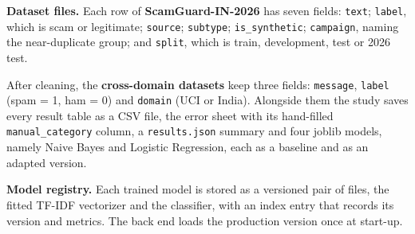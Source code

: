 \textbf{Dataset files.} Each row of \textbf{ScamGuard-IN-2026} has seven fields: \texttt{text}; \texttt{label}, which is scam or legitimate; \texttt{source}; \texttt{subtype}; \texttt{is\_synthetic}; \texttt{campaign}, naming the near-duplicate group; and \texttt{split}, which is train, development, test or 2026 test.

After cleaning, the \textbf{cross-domain datasets} keep three fields: \texttt{message}, \texttt{label} (spam = 1, ham = 0) and \texttt{domain} (UCI or India). Alongside them the study saves every result table as a CSV file, the error sheet with its hand-filled \texttt{manual\_category} column, a \texttt{results.json} summary and four joblib models, namely Naive Bayes and Logistic Regression, each as a baseline and as an adapted version.

\textbf{Model registry.} Each trained model is stored as a versioned pair of files, the fitted TF-IDF vectorizer and the classifier, with an index entry that records its version and metrics. The back end loads the production version once at start-up.
